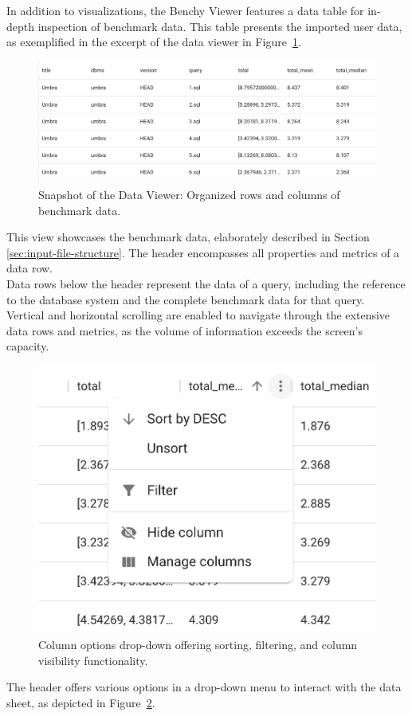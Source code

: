 In addition to visualizations, the Benchy Viewer features a data table for in-depth inspection of benchmark data. This table presents the imported user data, as exemplified in the excerpt of the data viewer in Figure~\ref{fig:data-viewer}.

\begin{figure}[h]
  \centering
  \includegraphics[width=0.8\linewidth]{figures/data-viewer.png}
  \caption{Snapshot of the Data Viewer: Organized rows and columns of benchmark data.}
  \label{fig:data-viewer}
\end{figure}

This view showcases the benchmark data, elaborately described in Section \ref{sec:input-file-structure}. The header encompasses all properties and metrics of a data row.\\
Data rows below the header represent the data of a query, including the reference to the database system and the complete benchmark data for that query.\\
Vertical and horizontal scrolling are enabled to navigate through the extensive data rows and metrics, as the volume of information exceeds the screen's capacity.

\begin{figure}[h]
  \centering
  \includegraphics[width=0.3\linewidth]{figures/data-viewer-header-options.png}
  \caption{Column options drop-down offering sorting, filtering, and column visibility functionality.}
  \label{fig:data-viewer-options}
\end{figure}

The header offers various options in a drop-down menu to interact with the data sheet, as depicted in Figure~\ref{fig:data-viewer-options}.

